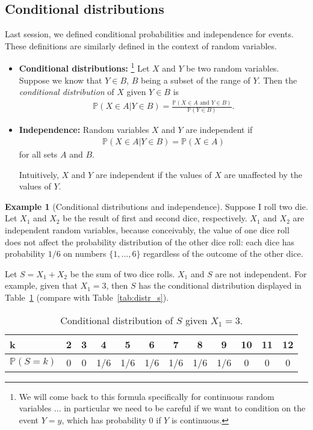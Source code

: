 \documentclass[11pt]{article}
\theoremstyle{definition}
\newtheorem{example}[theorem]{Example}
\renewcommand{\P}{\mathbb{P}}
\begin{document}
\subsection{Conditional distributions}
Last session, we defined conditional probabilities and independence for events.
These definitions are similarly defined in the context of random variables.
\begin{itemize}
  \item {\bf Conditional distributions: }\footnote{
  We will come back to this formula specifically for continuous random variables ...
  in particular we need to be careful if we want to condition on the event $Y = y$,
  which has probability 0 if $Y$ is continuous.
  }
  Let $X$ and $Y$ be two random variables. Suppose we know that $Y\in B$, $B$
  being a subset of the range of $Y$. Then the
  \textit{conditional distribution} of $X$ given $Y\in B$ is
  \begin{align*}
    \P(X\in A | Y \in B) = \frac{\P(X\in A \text{ and } Y \in B)}{\P(Y \in B)}.
  \end{align*}
  \item {\bf Independence: } Random variables $X$ and $Y$ are independent if
  \begin{align*}
    \P(X\in A | Y \in B) = \P(X\in A)
  \end{align*}
  for all sets $A$ and $B$.

  Intuitively, $X$ and $Y$ are independent if the values of $X$ are unaffected
  by the values of $Y$.
\end{itemize}

\begin{example}[Conditional distributions and independence]
Suppose I roll two die.
Let $X_1$ and $X_2$ be the result of first and second dice, respectively.
$X_1$ and $X_2$ are independent random variables, because conceivably,
the value of one dice roll does not affect the probability distribution of the other dice roll:
each dice has probability $1/6$ on numbers $\{1, ..., 6\}$
regardless of the outcome of the other dice.

Let $S = X_1 + X_2$ be the sum of two dice rolls.
$X_1$ and $S$ are not independent. For example, given that $X_1 = 3$, then
$S$ has the conditional distribution displayed in Table~\ref{tab:cond_s}
(compare with Table~\ref{tab:distr_s}).

\begin{table}[!h]
  \centering
  \begin{tabular}{l|ccccccccccc}
    k& 2 & 3 & 4 & 5 & 6 & 7 & 8 & 9 & 10 & 11 & 12\\\hline
    $\P(S = k)$ & 0 & 0 & 1/6 & 1/6 & 1/6 & 1/6 & 1/6 & 1/6 & 0 & 0 & 0
  \end{tabular}
  \caption{Conditional distribution of $S$ given $X_1 = 3$.}
  \label{tab:cond_s}
\end{table}


\end{example}
\end{document}
